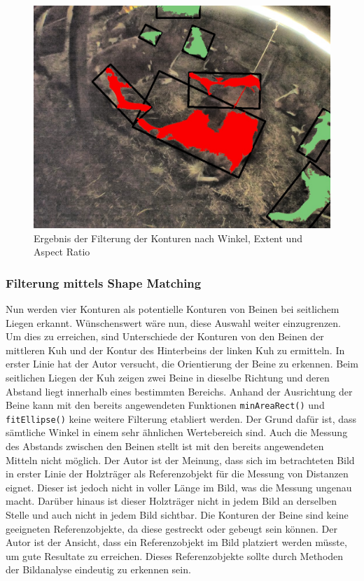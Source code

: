 \begin{figure}[H]
	\center
	\includegraphics[scale=0.43]{Grafiken/entwicklung/30FilteredByExtentAspectAngle.jpg}
	\caption{Ergebnis der Filterung der Konturen nach Winkel, Extent und Aspect Ratio} 
	\label{fig: Ergebnis der Filterung der Konturen nach Winkel, Extent und Aspect Ratio} 
\end{figure}

\subsubsection{Filterung mittels Shape Matching }
Nun werden vier Konturen als potentielle Konturen von Beinen bei seitlichem Liegen erkannt. Wünschenswert wäre nun, diese Auswahl weiter einzugrenzen. Um dies zu erreichen, sind Unterschiede der Konturen von den Beinen der mittleren Kuh und der Kontur des Hinterbeins der linken Kuh zu ermitteln. In erster Linie hat der Autor versucht, die Orientierung der Beine zu erkennen. Beim seitlichen Liegen der Kuh zeigen zwei Beine in dieselbe Richtung und deren Abstand liegt innerhalb eines bestimmten Bereichs. Anhand der Ausrichtung der Beine kann mit den bereits angewendeten Funktionen \texttt{minAreaRect()} und \texttt{fitEllipse()} keine weitere Filterung etabliert werden. Der Grund dafür ist, dass sämtliche Winkel in einem sehr ähnlichen Wertebereich sind. Auch die Messung des Abstands zwischen den Beinen stellt ist mit den bereits angewendeten Mitteln nicht möglich. Der Autor ist der Meinung, dass sich im betrachteten Bild in erster Linie der Holzträger als Referenzobjekt für die Messung von Distanzen eignet. Dieser ist jedoch nicht in voller Länge im Bild, was die Messung ungenau macht. Darüber hinaus ist dieser Holzträger nicht in jedem Bild an derselben Stelle und auch nicht in jedem Bild sichtbar. Die Konturen der Beine sind keine geeigneten Referenzobjekte, da diese gestreckt oder gebeugt sein können. Der Autor ist der Ansicht, dass ein Referenzobjekt im Bild platziert werden müsste, um gute Resultate zu erreichen. Dieses Referenzobjekte sollte durch Methoden der Bildanalyse eindeutig zu erkennen sein.

